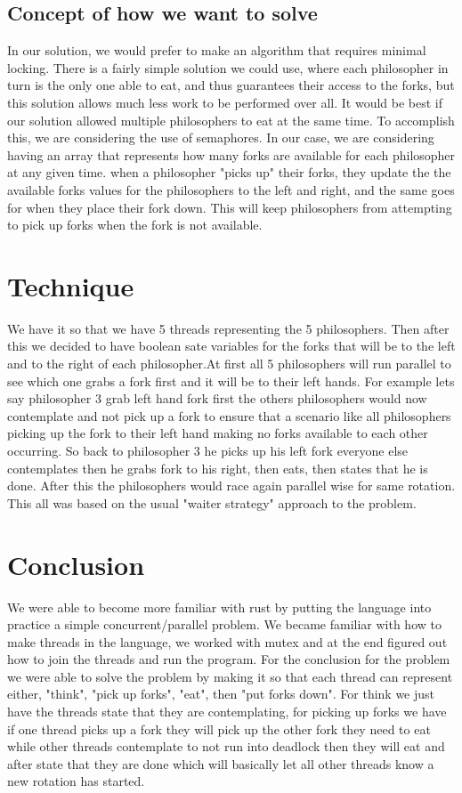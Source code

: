 \documentclass[conference]{IEEEtran}
\begin{document}
	\subsection*{Concept of how we want to solve}
	In our solution, we would prefer to make an algorithm that requires minimal locking. There is a fairly simple solution we could use, where each philosopher in turn is the only one able to eat, and thus guarantees their access to the forks, but this solution allows much less work to be performed over all. It would be best if our solution allowed multiple philosophers to eat at the same time. To accomplish this, we are considering the use of semaphores. In our case, we are considering having an array that represents how many forks are available for each philosopher at any given time. when a philosopher "picks up" their forks, they update the the available forks values for the philosophers to the left and right, and the same goes for when they place their fork down. This will keep philosophers from attempting to pick up forks when the fork is not available. 
	\section{Technique}
	We have it so that we have 5 threads representing the 5 philosophers. Then after this we decided to have boolean sate variables for the forks that will be to the left and to the right of each philosopher.At first all 5 philosophers will run parallel to see which one grabs a fork first and it will be to their left hands. For example lets say philosopher 3 grab left hand fork first the others philosophers would now contemplate and not pick up a fork to ensure that a scenario like all philosophers picking up the fork to their left hand making no forks available to each other occurring. So back to philosopher 3 he picks up his left fork everyone else contemplates then he grabs fork to his right, then eats, then states that he is done. After this the philosophers would race again parallel wise for same rotation. This all was based on the usual "waiter strategy" approach to the problem.
	\section{Conclusion}
	We were able to become more familiar with rust by putting the language into practice a simple concurrent/parallel problem. We became familiar with how to make threads in the language, we worked with mutex and  at the end figured out how to join the threads and run the program. 
	\linebreak
	For the conclusion for the problem we were able to solve the problem by making it so that each thread can represent either, "think", "pick up forks", "eat", then "put forks down". For think we just have the threads state that they are contemplating, for picking up forks we have if one thread picks up a fork they will pick up the other fork they need to eat while other threads contemplate to not run into deadlock then they will eat and after state that they are done which will basically let all other threads know a new rotation has started.

	\pagebreak
	
	
\end{document}
